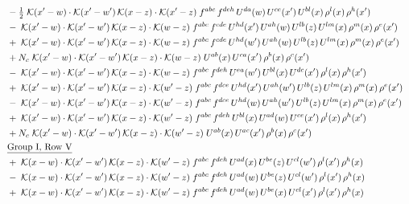 \documentclass[9pt]{article}
\begin{document}
\begin{align}
&\quad -\tfrac{1}{2}\;\mathcal{K}(x'-w)\cdot\mathcal{K}(x'-w')\,\mathcal{K}(x-z)\cdot\mathcal{K}(x'-z)\;f^{abc}\,f^{deh}\,U^{da}(w)\,U^{ce}(x')\,U^{bl}(x)\,\rho^{l}(x)\,\rho^{h}(x')\notag\\
&\quad -\;\mathcal{K}(x'-w)\cdot\mathcal{K}(x'-w')\,\mathcal{K}(x-z)\cdot\mathcal{K}(w-z)\;f^{abc}\,f^{cde}\,U^{hd}(x')\,U^{ah}(w)\,U^{lb}(z)\,U^{lm}(x)\,\rho^{m}(x)\,\rho^{e}(x')\notag\\
&\quad +\;\mathcal{K}(x'-w)\cdot\mathcal{K}(x'-w')\,\mathcal{K}(x-z)\cdot\mathcal{K}(w-z)\;f^{abc}\,f^{cde}\,U^{hd}(w')\,U^{ah}(w)\,U^{lb}(z)\,U^{lm}(x)\,\rho^{m}(x)\,\rho^{e}(x')\notag\\
&\quad +N_c\;\mathcal{K}(x'-w)\cdot\mathcal{K}(x'-w')\,\mathcal{K}(x-z)\cdot\mathcal{K}(w-z)\;U^{ab}(x)\,U^{ca}(x')\,\rho^{b}(x)\,\rho^{c}(x')\notag\\
&\quad -\;\mathcal{K}(x'-w)\cdot\mathcal{K}(x'-w')\,\mathcal{K}(x-z)\cdot\mathcal{K}(w-z)\;f^{abc}\,f^{deh}\,U^{ea}(w')\,U^{bl}(x)\,U^{dc}(x')\,\rho^{l}(x)\,\rho^{h}(x')\notag\\
&\quad +\;\mathcal{K}(x'-w)\cdot\mathcal{K}(x'-w')\,\mathcal{K}(x-z)\cdot\mathcal{K}(w'-z)\;f^{abc}\,f^{dce}\,U^{hd}(x')\,U^{ah}(w')\,U^{lb}(z)\,U^{lm}(x)\,\rho^{m}(x)\,\rho^{e}(x')\notag\\
&\quad -\;\mathcal{K}(x'-w)\cdot\mathcal{K}(x'-w')\,\mathcal{K}(x-z)\cdot\mathcal{K}(w'-z)\;f^{abc}\,f^{dce}\,U^{hd}(w)\,U^{ah}(w')\,U^{lb}(z)\,U^{lm}(x)\,\rho^{m}(x)\,\rho^{e}(x')\notag\\
&\quad +\;\mathcal{K}(x'-w)\cdot\mathcal{K}(x'-w')\,\mathcal{K}(x-z)\cdot\mathcal{K}(w'-z)\;f^{abc}\,f^{deh}\,U^{bl}(x)\,U^{ad}(w)\,U^{ce}(x')\,\rho^{l}(x)\,\rho^{h}(x')\notag\\
&\quad +N_c\;\mathcal{K}(x'-w)\cdot\mathcal{K}(x'-w')\,\mathcal{K}(x-z)\cdot\mathcal{K}(w'-z)\;U^{ab}(x)\,U^{ac}(x')\,\rho^{b}(x)\,\rho^{c}(x')\notag\\
&\quad\underline{\text{Group I, Row V}}\notag\\
&\quad +\;\mathcal{K}(x-w)\cdot\mathcal{K}(x'-w')\,\mathcal{K}(x-z)\cdot\mathcal{K}(w'-z)\;f^{abc}\,f^{deh}\,U^{ad}(x)\,U^{be}(z)\,U^{cl}(w')\,\rho^{l}(x')\,\rho^{h}(x)\notag\\
&\quad -\;\mathcal{K}(x-w)\cdot\mathcal{K}(x'-w')\,\mathcal{K}(x-z)\cdot\mathcal{K}(w'-z)\;f^{abc}\,f^{deh}\,U^{ad}(w)\,U^{be}(z)\,U^{cl}(w')\,\rho^{l}(x')\,\rho^{h}(x)\notag\\
&\quad +\;\mathcal{K}(x-w)\cdot\mathcal{K}(x'-w')\,\mathcal{K}(x-z)\cdot\mathcal{K}(w'-z)\;f^{abc}\,f^{deh}\,U^{ad}(w)\,U^{be}(x)\,U^{cl}(x')\,\rho^{l}(x')\,\rho^{h}(x)\notag\\

\end{align}
\end{document}
